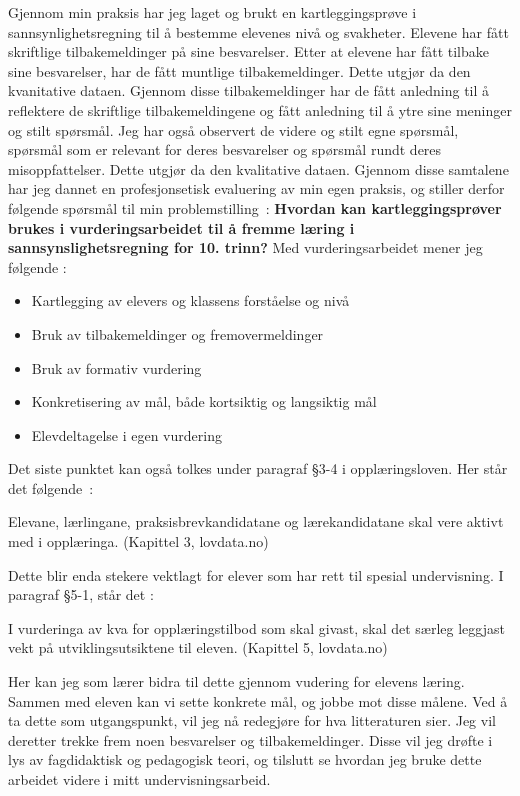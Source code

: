 \documentclass[main.tex]{subfiles}
\begin{document}
Gjennom min praksis har jeg laget og brukt en kartleggingsprøve i sannsynlighetsregning til å bestemme
elevenes nivå og svakheter. Elevene har fått skriftlige tilbakemeldinger på sine besvarelser.
Etter at elevene har fått tilbake sine besvarelser, har de fått muntlige tilbakemeldinger. Dette utgjør da 
den kvanitative dataen. Gjennom disse tilbakemeldinger har de fått anledning til å reflektere
de skriftlige tilbakemeldingene og fått anledning til å ytre sine meninger og stilt spørsmål. Jeg har også
observert de videre og stilt egne spørsmål, spørsmål som er relevant for deres besvarelser og spørsmål
rundt deres misoppfattelser. Dette utgjør da den kvalitative dataen. Gjennom disse samtalene har jeg dannet 
en profesjonsetisk evaluering av min egen praksis, og stiller derfor følgende spørsmål til min 
\mbox{problemstilling :}
\newline
\newline
\textbf{Hvordan kan kartleggingsprøver brukes i vurderingsarbeidet til å fremme læring i 
        sannsynslighetsregning for 10. trinn?}
\newline
\newline
Med vurderingsarbeidet mener jeg følgende :
\begin{itemize}
\item Kartlegging av elevers og klassens forståelse og nivå
\item Bruk av tilbakemeldinger og fremovermeldinger
\item Bruk av formativ vurdering
\item Konkretisering av mål, både kortsiktig og langsiktig mål
\item Elevdeltagelse i egen vurdering
\end{itemize}

Det siste punktet kan også tolkes under paragraf \S 3-4 i opplæringsloven. Her står det \mbox{følgende :}
\begin{displayquote}
Elevane, lærlingane, praksisbrevkandidatane og lærekandidatane skal vere aktivt med i opplæringa.
(Kapittel 3, lovdata.no)
\end{displayquote}
Dette blir enda stekere vektlagt for elever som har rett til spesial undervisning. I paragraf \S 5-1, står det :
\begin{displayquote}
I vurderinga av kva for opplæringstilbod som skal givast, skal det særleg leggjast vekt på utviklingsutsiktene til eleven.
(Kapittel 5, lovdata.no)
\end{displayquote}
Her kan jeg som lærer bidra til dette gjennom vudering for elevens læring. Sammen med eleven kan vi sette konkrete mål,
og jobbe mot disse målene. Ved å ta dette som utgangspunkt, vil jeg nå redegjøre for hva litteraturen sier.
Jeg vil deretter trekke frem noen besvarelser og tilbakemeldinger. Disse vil jeg drøfte i lys av fagdidaktisk og 
pedagogisk teori, og tilslutt se hvordan jeg bruke dette arbeidet videre i mitt undervisningsarbeid.
\end{document}
